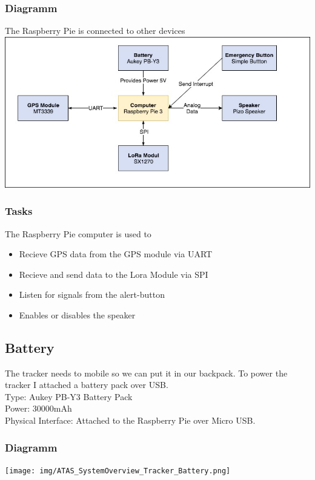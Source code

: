 \documentclass[a4paper,11pt, oneside]{report}
\theoremstyle{definition}
\begin{document}
\subsubsection{Diagramm}
The Raspberry Pie is connected to other devices\\[0.3cm]
\includegraphics[width=\textwidth]{img/ATAS_SystemOverview_Tracker_Computer.jpg}

\subsubsection{Tasks}
The Raspberry Pie computer is used to
\begin{itemize}
\item Recieve GPS data from the GPS module via UART
\item Recieve and send data to the Lora Module via SPI
\item Listen for signals from the alert-button
\item Enables or disables the speaker
\end{itemize}


\newpage
\subsection{Battery}
The tracker needs to mobile so we can put it in our backpack. To power the tracker I attached a battery pack over USB.\\[0.3cm]
Type: Aukey PB-Y3 Battery Pack\\
Power: 30000mAh\\
Physical Interface: Attached to the Raspberry Pie over Micro USB.
\subsubsection{Diagramm}
\texttt{[image: img/ATAS\_SystemOverview\_Tracker\_Battery.png]}
\end{document}
